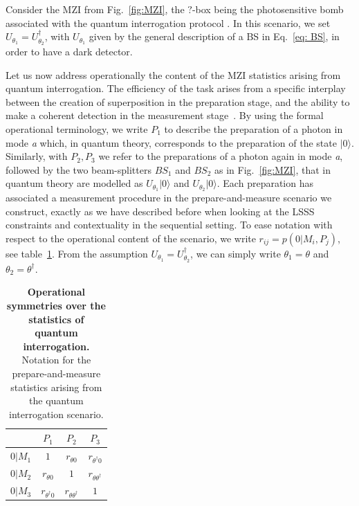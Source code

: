 \documentclass[letterpaper,onecolumn,12pt,accepted=2024-01-17]{article}
\begin{document}
Consider the MZI from Fig.~\ref{fig:MZI}, the $?$-box being the photosensitive bomb associated with the quantum interrogation protocol \cite{elitzur1993quantum}. In this scenario, we set $U_{\theta_1} = U_{\theta_2}^\dagger$, with $U_{\theta_1}$ given by the general description of a BS in Eq.~\eqref{eq: BS}, in order to have a dark detector.

Let us now address operationally the content of the MZI statistics arising from quantum interrogation. The  efficiency of the task arises from a specific interplay between the creation of superposition in the preparation stage, and the ability to make a coherent detection in the measurement stage~\cite{masini2021coherence}. By using the formal operational terminology, we write $P_1$ to describe the preparation of a photon in mode \textit{a} which, in quantum theory, corresponds to the preparation of the state  $\vert 0 \rangle$. Similarly, with $P_2, P_3$ we refer to the preparations of a photon again in mode \textit{a}, followed by the two beam-splitters $BS_1$ and $BS_2$ as in Fig.~\ref{fig:MZI}, that in quantum theory are modelled as $U_{\theta_1} \vert 0 \rangle$ and $U_{\theta_2}\vert 0 \rangle$. Each preparation has associated a measurement procedure in the prepare-and-measure scenario we construct, exactly as we have described before when looking at the LSSS constraints and contextuality in the sequential setting. To ease notation with respect to the operational content of the scenario, we write $r_{ij} = p(0 \vert M_i, P_j)$, see table~\ref{tab:operational_content_table}. From the assumption $U_{\theta_1} = U_{\theta_2}^\dagger$, we can simply write $\theta_1 = \theta$ and $\theta_2 = \theta^\dagger$.

\begin{table}
    \centering
    \begin{tabular}{|c|c|c|c|}
    \hline
         & $P_1$ & $P_2$ & $P_3$ \\
    \hline
    $0|M_1$  &  $1$  &   $r_{\theta 0}$  &  $r_{\theta^\dagger 0}$   \\
    \hline
    $0|M_2$  &  $r_{\theta 0}$   &  $1$ &   $r_{\theta \theta^\dagger}$  \\
    \hline
    $0|M_3$  &  $r_{\theta^\dagger 0}$   &  $r_{\theta \theta^\dagger}$   &  $1$   \\
    \hline
    \end{tabular}
    \caption{\textbf{Operational symmetries over the statistics of quantum interrogation.} Notation for the prepare-and-measure statistics arising from the quantum interrogation scenario.}
    \label{tab:operational_content_table}
\end{table}
\end{document}
